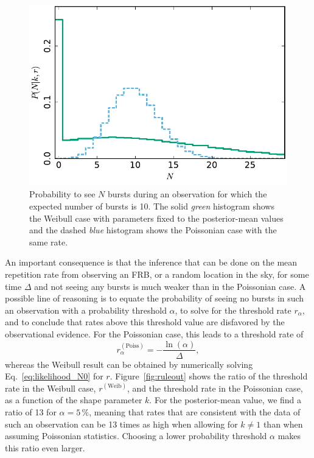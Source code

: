 \documentclass[fleqn,usenatbib]{mnras}
\newcommand{\new}[1]{#1}
\begin{document}
\begin{figure}
	\includegraphics[width=1.0\columnwidth]{n_singleint.pdf}
	\caption{\label{fig:n_singleint}Probability to see $N$ bursts during an observation for which the expected number of bursts is 10. The solid \emph{green} histogram shows the Weibull case with parameters fixed to the posterior-mean values and the dashed \emph{blue} histogram shows the Poissonian case with the same rate.}
\end{figure}

\new{An important consequence is that the inference that can be done on the mean repetition rate from observing an FRB, or a random location in the sky, for some time $\Delta$ and not seeing any bursts is much weaker than in the Poissonian case. A possible line of reasoning is to equate the probability of seeing no bursts in such an observation with a probability threshold $\alpha$, to solve for the threshold rate $r_\alpha$, and to conclude that rates above this threshold value are disfavored by the observational evidence. For the Poissonian case, this leads to a threshold rate of
\begin{equation}
	r^{\mathrm{(Poiss)}}_\alpha = - \frac{\ln(\alpha)}{\Delta},
\end{equation}
whereas the Weibull result can be obtained by numerically solving Eq.~\eqref{eq:likelihood_N0} for $r$. Figure~\ref{fig:ruleout} shows the ratio of the threshold rate in the Weibull case, $r^{\mathrm{(Weib)}}$, and the threshold rate in the Poissonian case, as a function of the shape parameter $k$. For the posterior-mean value, we find a ratio of 13 for $\alpha = 5\,\%$, meaning that rates that are consistent with the data of such an observation can be 13 times as high when allowing for $k \neq 1$ than when assuming Poissonian statistics. Choosing a lower probability threshold $\alpha$ makes this ratio even larger.}
\end{document}

